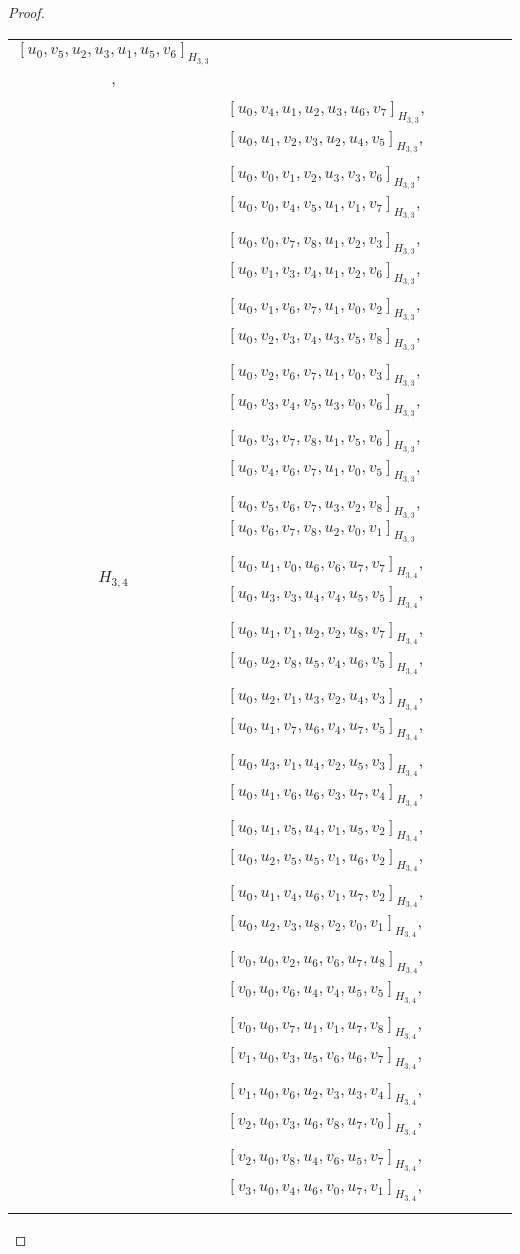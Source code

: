 \begin{subappendices}
\begin{proof}
{\begin{longtable}{|c|l|}
  $[u_0, v_5, u_2, u_3, u_1, u_5, v_6]_{H_{3,3}}$, \\* &
  $[u_0, v_4, u_1, u_2, u_3, u_6, v_7]_{H_{3,3}}$,
  $[u_0, u_1, v_2, v_3, u_2, u_4, v_5]_{H_{3,3}}$, \\* &
  $[u_0, v_0, v_1, v_2, u_3, v_3, v_6]_{H_{3,3}}$,
  $[u_0, v_0, v_4, v_5, u_1, v_1, v_7]_{H_{3,3}}$, \\* &
  $[u_0, v_0, v_7, v_8, u_1, v_2, v_3]_{H_{3,3}}$,
  $[u_0, v_1, v_3, v_4, u_1, v_2, v_6]_{H_{3,3}}$, \\* &
  $[u_0, v_1, v_6, v_7, u_1, v_0, v_2]_{H_{3,3}}$,
  $[u_0, v_2, v_3, v_4, u_3, v_5, v_8]_{H_{3,3}}$, \\* &
  $[u_0, v_2, v_6, v_7, u_1, v_0, v_3]_{H_{3,3}}$,
  $[u_0, v_3, v_4, v_5, u_3, v_0, v_6]_{H_{3,3}}$, \\* &
  $[u_0, v_3, v_7, v_8, u_1, v_5, v_6]_{H_{3,3}}$,
  $[u_0, v_4, v_6, v_7, u_1, v_0, v_5]_{H_{3,3}}$, \\* &
  $[u_0, v_5, v_6, v_7, u_3, v_2, v_8]_{H_{3,3}}$,
  $[u_0, v_6, v_7, v_8, u_2, v_0, v_1]_{H_{3,3}}$
\\ \hline
$H_{3,4}$ &
  $[u_0, u_1, v_0, u_6, v_6, u_7, v_7]_{H_{3,4}}$,
  $[u_0, u_3, v_3, u_4, v_4, u_5, v_5]_{H_{3,4}}$, \\* &
  $[u_0, u_1, v_1, u_2, v_2, u_8, v_7]_{H_{3,4}}$,
  $[u_0, u_2, v_8, u_5, v_4, u_6, v_5]_{H_{3,4}}$, \\* &
  $[u_0, u_2, v_1, u_3, v_2, u_4, v_3]_{H_{3,4}}$,
  $[u_0, u_1, v_7, u_6, v_4, u_7, v_5]_{H_{3,4}}$, \\* &
  $[u_0, u_3, v_1, u_4, v_2, u_5, v_3]_{H_{3,4}}$,
  $[u_0, u_1, v_6, u_6, v_3, u_7, v_4]_{H_{3,4}}$, \\* &
  $[u_0, u_1, v_5, u_4, v_1, u_5, v_2]_{H_{3,4}}$,
  $[u_0, u_2, v_5, u_5, v_1, u_6, v_2]_{H_{3,4}}$, \\* &
  $[u_0, u_1, v_4, u_6, v_1, u_7, v_2]_{H_{3,4}}$,
  $[u_0, u_2, v_3, u_8, v_2, v_0, v_1]_{H_{3,4}}$, \\* &
  $[v_0, u_0, v_2, u_6, v_6, u_7, u_8]_{H_{3,4}}$,
  $[v_0, u_0, v_6, u_4, v_4, u_5, v_5]_{H_{3,4}}$, \\* &
  $[v_0, u_0, v_7, u_1, v_1, u_7, v_8]_{H_{3,4}}$,
  $[v_1, u_0, v_3, u_5, v_6, u_6, v_7]_{H_{3,4}}$, \\* &
  $[v_1, u_0, v_6, u_2, v_3, u_3, v_4]_{H_{3,4}}$,
  $[v_2, u_0, v_3, u_6, v_8, u_7, v_0]_{H_{3,4}}$, \\* &
  $[v_2, u_0, v_8, u_4, v_6, u_5, v_7]_{H_{3,4}}$,
  $[v_3, u_0, v_4, u_6, v_0, u_7, v_1]_{H_{3,4}}$, \\* &

\end{longtable}}
\end{proof}
\end{subappendices}
